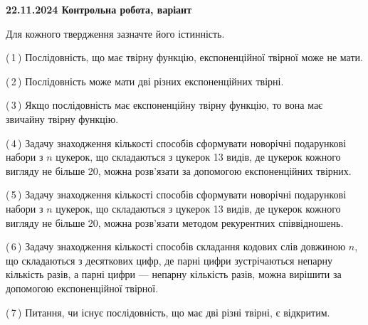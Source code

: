 \documentclass[12pt, ukrainian]{article}
\begin{document}
\begin {large}
\begin {large}
\begin {large}
\begin {large}
\begin {large}
\begin {large}
\begin {large}
\begin {large}
\begin {large}
\begin {large}
\begin {large}
\begin {large}
\begin {large}
\begin {large}
\begin {large}
\begin {large}
\begin {large}
\begin {large}
\begin {large}
\begin {large}
\begin {large}
\begin {large}
\begin {large}
\begin {large}
\begin {large}
\begin {large}
\begin {large}
\begin {large}
\begin {large}
\begin {large}
\begin {large}
\begin {large}
\begin {large}
\begin {large}
\begin {large}
\begin {large}
\begin {large}
{\vspace{5mm}
}
\newpage

\begin {large}

\textbf{22.11.2024 Контрольна робота, варіант  }\par


{
Для кожного твердження зазначте його істинність.\par

\vspace{2mm}

(\,1\,) Послідовність, що має твірну функцію, експоненційної твірної може не мати.%



(\,2\,) Послідовність може мати дві різних експоненційних твірні.%



(\,3\,) Якщо послідовність має експоненційну твірну функцію, то вона має звичайну твірну функцію.%



(\,4\,) Задачу знаходження кількості способів сформувати новорічні подарункові набори з $n$ цукерок, що складаються з цукерок 13 видів, де цукерок кожного вигляду не більше 20, можна розв’язати за допомогою експоненційних твірних.%



(\,5\,) Задачу знаходження кількості способів сформувати новорічні подарункові набори з $n$ цукерок, що складаються з цукерок 13 видів, де цукерок кожного вигляду не більше 20, можна розв’язати методом рекурентних співвідношень.%



(\,6\,) Задачу знаходження кількості способів складання кодових слів довжиною $n$, що складаються з десяткових цифр, де парні цифри зустрічаються непарну кількість разів, а парні цифри — непарну кількість разів, можна вирішити за допомогою експоненційної твірної.%



(\,7\,) Питання, чи існує послідовність, що має дві різні твірні, є відкритим.%



}
\end{large}
\end{large}
\end{large}
\end{large}
\end{large}
\end{large}
\end{large}
\end{large}
\end{large}
\end{large}
\end{large}
\end{large}
\end{large}
\end{large}
\end{large}
\end{large}
\end{large}
\end{large}
\end{large}
\end{large}
\end{large}
\end{large}
\end{large}
\end{large}
\end{large}
\end{large}
\end{large}
\end{large}
\end{large}
\end{large}
\end{large}
\end{large}
\end{large}
\end{large}
\end{large}
\end{large}
\end{large}
\end{large}
\end{document}
